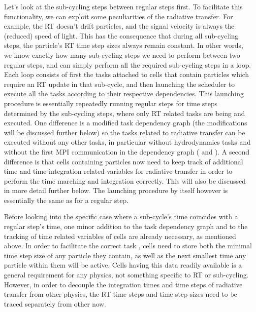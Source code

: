 Let's look at the sub-cycling steps between regular steps first. To facilitate this functionality,
we can exploit some peculiarities of the radiative transfer. For example, the RT doesn't drift
particles, and the signal velocity is always the (reduced) speed of light. This has the consequence
that during all sub-cycling steps, the particle's RT time step sizes always remain constant. In
other words, we know exactly how many sub-cycling steps we need to perform between two regular
steps, and can simply perform all the required sub-cycling steps in a loop. Each loop consists of
first  the tasks attached to cells that contain particles which require an RT
update in that sub-cycle, and then launching the scheduler to execute all the  tasks
according to their respective dependencies. This launching procedure is essentially repeatedly
running regular steps for time steps determined by the sub-cycling steps, where only RT related
tasks are being  and executed. One difference is a modified task dependency graph
(the modifications will be discussed further below) so the tasks related to radiative transfer can
be executed without any other tasks, in particular without hydrodynamics tasks and without the first
MPI communication in the dependency graph ( and ). A second
difference is that cells containing particles now need to keep track of additional time and time
integration related variables for radiative transfer in order to perform the time marching and
integration correctly. This will also be discussed in more detail further below. The launching
procedure by itself however is essentially the same as for a regular step.

Before looking into the specific case where a sub-cycle's time coincides with a regular step's
time, one minor addition to the task dependency graph and to the tracking of time related variables
of cells are already necessary, as mentioned above. In order to facilitate the correct task
, cells need to store both the minimal time step size of any particle they
contain, as well as the next smallest time any particle within them will be active. Cells having
this data readily available is a general requirement for any physics, not something specific to RT
or sub-cycling. However, in order to decouple the integration times and time steps of radiative
transfer from other physics, the RT time steps and time step sizes need to be traced separately
from other now.

